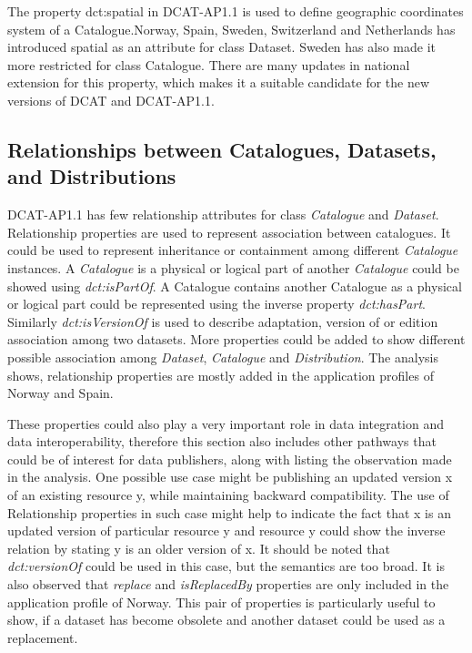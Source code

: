 \documentclass[<options>]{elsarticle}
\begin{document}
The property dct:spatial in DCAT-AP1.1 is used to define geographic coordinates system of a Catalogue.Norway, Spain, Sweden, Switzerland and Netherlands has introduced spatial as an attribute for class Dataset. Sweden has also made it more restricted for class Catalogue. There are many updates in national extension for this property, which makes it a suitable candidate for the new versions of DCAT and DCAT-AP1.1.

\subsection{Relationships between Catalogues, Datasets, and Distributions}
DCAT-AP1.1 has few relationship attributes for class\textit{ Catalogue} and \textit{Dataset}. Relationship properties are used to represent association between catalogues. It could be used to represent inheritance or containment among different \textit{Catalogue} instances. A \textit{Catalogue} is a physical or logical part of another \textit{Catalogue} could be showed using \textit{dct:isPartOf}. A Catalogue contains another Catalogue as a physical or logical part could be represented using the inverse property \textit{dct:hasPart}. Similarly \textit{dct:isVersionOf }is used to describe adaptation, version of or edition association among two datasets. More properties could be added to show different possible association among\textit{ Dataset}, \textit{Catalogue} and \textit{Distribution}. The analysis shows, relationship properties are mostly added in the application profiles of Norway and Spain.

These properties could also play a very important role in data integration and data interoperability, therefore this section also includes other pathways that could be of interest for data publishers, along with listing the observation made in the analysis. One possible use case might be publishing an updated version x of an existing resource y, while maintaining backward compatibility. The use of Relationship properties in such case might help to indicate the fact that x is an updated version of particular resource y and resource y could show the inverse relation by stating y is an older version of x. It should be noted that \textit{dct:versionOf} could be used in this case, but the semantics are too broad. It is also observed that \textit{replace} and \textit{isReplacedBy} properties are only included in the application profile of Norway. This pair of properties is particularly useful to show, if a dataset has become obsolete and another dataset could be used as a replacement.
\end{document}
